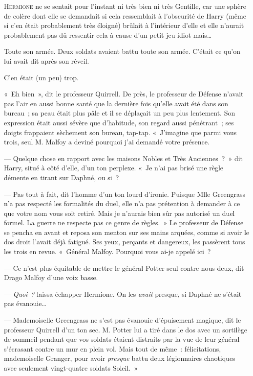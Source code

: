 
\lettrine{H}{ermione} ne se sentait pour l'instant ni très bien ni très Gentille, car une sphère de colère dont elle se demandait si cela ressemblait à l'obscurité de Harry (même si c'en était probablement très éloigné) brûlait à l'intérieur d'elle et elle n'aurait probablement pas dû ressentir cela à cause d'un petit jeu idiot mais…

Toute son armée. Deux soldats avaient battu toute son armée. C'était ce qu'on lui avait dit après son réveil.

C'en était (un peu) trop.

«~Eh bien~», dit le professeur Quirrell. De près, le professeur de Défense n'avait pas l'air en aussi bonne santé que la dernière fois qu'elle avait été dans son bureau~; sa peau était plus pâle et il se déplaçait un peu plus lentement. Son expression était aussi sévère que d'habitude, son regard aussi pénétrant~; ses doigts frappaient sèchement son bureau, tap-tap. «~J'imagine que parmi vous trois, seul M. Malfoy a deviné pourquoi j'ai demandé votre présence.

--- Quelque chose en rapport avec les maisons Nobles et Très Anciennes~?~» dit Harry, situé à côté d'elle, d'un ton perplexe. «~Je n'ai pas brisé une règle démente en tirant sur Daphné, ou si~?

--- Pas tout à fait, dit l'homme d'un ton lourd d'ironie. Puisque Mlle Greengrass n'a pas respecté les formalités du duel, elle n'a pas prétention à demander à ce que votre nom vous soit retiré. Mais je n'aurais bien sûr pas autorisé un duel formel. La guerre ne respecte pas ce genre de règles.~» Le professeur de Défense se pencha en avant et reposa son menton sur ses mains arquées, comme si avoir le dos droit l'avait déjà fatigué. Ses yeux, perçants et dangereux, les passèrent tous les trois en revue. «~Général Malfoy. Pourquoi vous ai-je appelé ici~?

--- Ce n'est plus équitable de mettre le général Potter seul contre nous deux, dit Drago Malfoy d'une voix basse.

--- \emph{Quoi~?} laissa échapper Hermione. On les \emph{avait} presque, si Daphné ne s'était pas évanouie…

--- Mademoiselle Greengrass ne s'est pas évanouie d'épuisement magique, dit le professeur Quirrell d'un ton sec. M. Potter lui a tiré dans le dos avec un sortilège de sommeil pendant que vos soldats étaient distraits par la vue de leur général s'écrasant contre un mur en plein vol. Mais tout de même~: félicitations, mademoiselle Granger, pour avoir \emph{presque} battu deux légionnaires chaotiques avec seulement vingt-quatre soldats Soleil.~»

